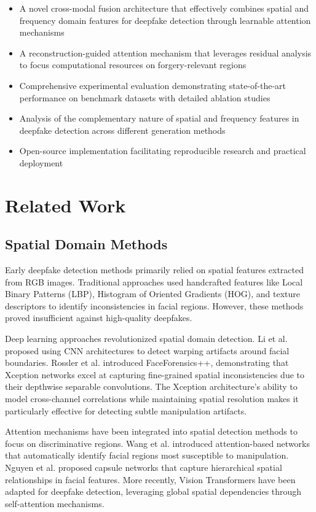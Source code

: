 \documentclass[letterpaper]{article} %
\begin{document}
\begin{itemize}
\item A novel cross-modal fusion architecture that effectively combines spatial and frequency domain features for deepfake detection through learnable attention mechanisms
\item A reconstruction-guided attention mechanism that leverages residual analysis to focus computational resources on forgery-relevant regions
\item Comprehensive experimental evaluation demonstrating state-of-the-art performance on benchmark datasets with detailed ablation studies
\item Analysis of the complementary nature of spatial and frequency features in deepfake detection across different generation methods
\item Open-source implementation facilitating reproducible research and practical deployment
\end{itemize}

\section{Related Work}

\subsection{Spatial Domain Methods}

Early deepfake detection methods primarily relied on spatial features extracted from RGB images. Traditional approaches used handcrafted features like Local Binary Patterns (LBP), Histogram of Oriented Gradients (HOG), and texture descriptors to identify inconsistencies in facial regions. However, these methods proved insufficient against high-quality deepfakes.

Deep learning approaches revolutionized spatial domain detection. Li et al. proposed using CNN architectures to detect warping artifacts around facial boundaries. Rossler et al. introduced FaceForensics++, demonstrating that Xception networks excel at capturing fine-grained spatial inconsistencies due to their depthwise separable convolutions. The Xception architecture's ability to model cross-channel correlations while maintaining spatial resolution makes it particularly effective for detecting subtle manipulation artifacts.

Attention mechanisms have been integrated into spatial detection methods to focus on discriminative regions. Wang et al. introduced attention-based networks that automatically identify facial regions most susceptible to manipulation. Nguyen et al. proposed capsule networks that capture hierarchical spatial relationships in facial features. More recently, Vision Transformers have been adapted for deepfake detection, leveraging global spatial dependencies through self-attention mechanisms.
\end{document}
